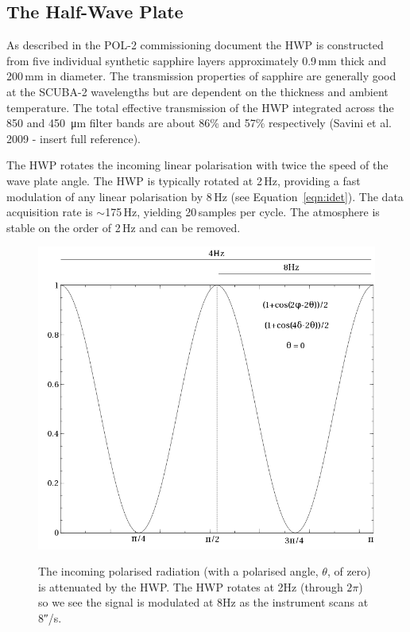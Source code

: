 \subsection*{The Half-Wave Plate}

As described in the POL-2 commissioning document the HWP is
constructed from five individual synthetic sapphire layers
approximately 0.9\,mm thick and 200\,mm in diameter. The transmission
properties of sapphire are generally good at the SCUBA-2 wavelengths
but are dependent on the thickness and ambient temperature. The total
effective transmission of the HWP integrated across the 850 and
\SI{450}{\micro\metre} filter bands are about 86\% and 57\%
respectively (Savini et al. 2009 - insert full reference).

The HWP rotates the incoming linear polarisation with twice the speed
of the wave plate angle.  The HWP is typically rotated at 2\,Hz,
providing a fast modulation of any linear polarisation by 8\,Hz (see
Equation~\ref{eqn:idet}).  The data acquisition rate is $\sim$175\,Hz, yielding
20\,samples per cycle.  The atmosphere is stable on the order of 2\,Hz and
can be removed.


\begin{figure}[t!]
\begin{center}
\includegraphics[width=0.7\linewidth]{hwp-modulation.png}
\label{fig:hwpmodulation}
\caption [Attenuation of signal by HWP]{The incoming polarised
  radiation (with a polarised angle, $\theta$, of zero) is attenuated
  by the HWP.  The HWP rotates at 2Hz (through $2\pi$) so we see the
  signal is modulated at 8Hz as the instrument scans at
  8\si{\arcsecond}/s. }
\end{center}
\end{figure}



